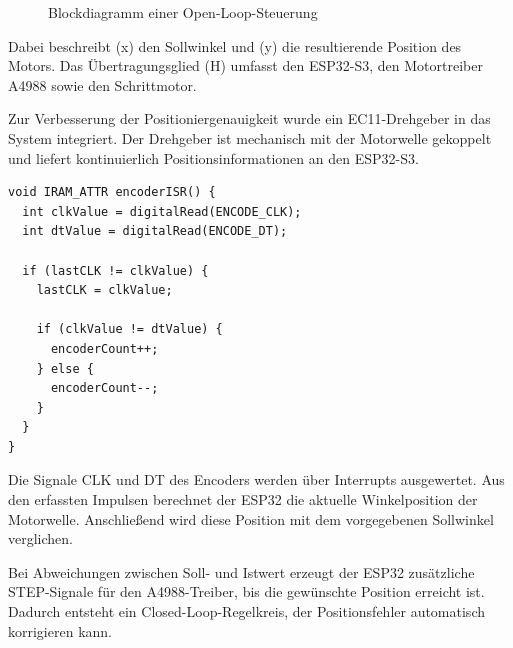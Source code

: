 \documentclass[a4paper,12pt]{article}
\begin{document}
\begin{figure}[H]
\centering


\caption{Blockdiagramm einer Open-Loop-Steuerung}
\end{figure}

Dabei beschreibt (x) den Sollwinkel und (y) die resultierende Position des Motors. Das Übertragungsglied (H) umfasst den ESP32-S3, den Motortreiber A4988 sowie den Schrittmotor.



Zur Verbesserung der Positioniergenauigkeit wurde ein EC11-Drehgeber in das System integriert. Der Drehgeber ist mechanisch mit der Motorwelle gekoppelt und liefert kontinuierlich Positionsinformationen an den ESP32-S3.

\begin{verbatim}
void IRAM_ATTR encoderISR() {
  int clkValue = digitalRead(ENCODE_CLK);
  int dtValue = digitalRead(ENCODE_DT);

  if (lastCLK != clkValue) {
    lastCLK = clkValue;

    if (clkValue != dtValue) {
      encoderCount++;
    } else {
      encoderCount--;
    }
  }
}
\end{verbatim}

Die Signale CLK und DT des Encoders werden über Interrupts ausgewertet. Aus den erfassten Impulsen berechnet der ESP32 die aktuelle Winkelposition der Motorwelle. Anschließend wird diese Position mit dem vorgegebenen Sollwinkel verglichen.

Bei Abweichungen zwischen Soll- und Istwert erzeugt der ESP32 zusätzliche STEP-Signale für den A4988-Treiber, bis die gewünschte Position erreicht ist. Dadurch entsteht ein Closed-Loop-Regelkreis, der Positionsfehler automatisch korrigieren kann.
\end{document}
